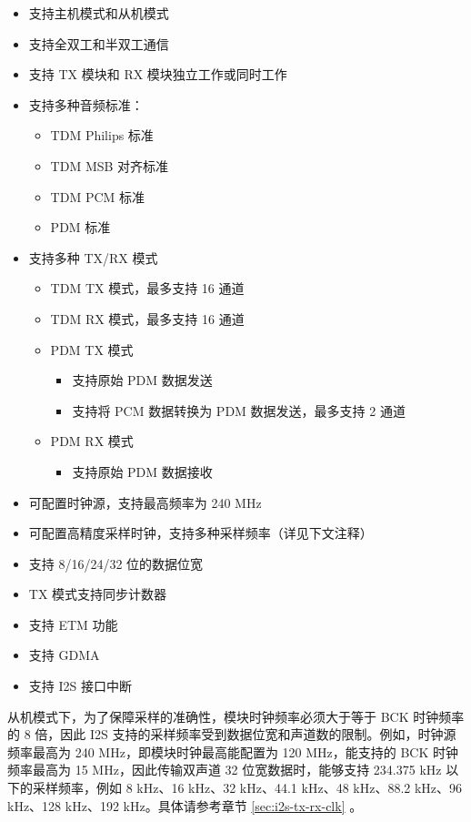 \documentclass[main\_\_CN.tex]{subfiles}
\begin{document}
\begin{itemize}
    \item 支持主机模式和从机模式
    \item 支持全双工和半双工通信
    \item 支持 TX 模块和 RX 模块独立工作或同时工作
    \item 支持多种音频标准：
        \begin{itemize}    
            \item TDM Philips 标准
            \item TDM MSB 对齐标准
            \item TDM PCM 标准
            \item PDM 标准
        \end{itemize}
    \item 支持多种 TX/RX 模式
        \begin{itemize}
        \item TDM TX 模式，最多支持 16 通道
        \item TDM RX 模式，最多支持 16 通道
        \item PDM TX 模式
        \begin{itemize}
            \item 支持原始 PDM 数据发送
            \item 支持将 PCM 数据转换为 PDM 数据发送，最多支持 2 通道
        \end{itemize}
        \item PDM RX 模式
        \begin{itemize}
            \item 支持原始 PDM 数据接收
        \end{itemize}
        \end{itemize}
    \item 可配置时钟源，支持最高频率为 240 MHz
    \item 可配置高精度采样时钟，支持多种采样频率（详见下文注释）
    \item 支持 8/16/24/32 位的数据位宽
    \item TX 模式支持同步计数器
    \item 支持 ETM 功能
    \item 支持 GDMA
    \item 支持 I2S 接口中断
\end{itemize}

\begin{tiplisting}
从机模式下，为了保障采样的准确性，模块时钟频率必须大于等于 BCK 时钟频率的 8 倍，因此 I2S 支持的采样频率受到数据位宽和声道数的限制。例如，时钟源频率最高为 240 MHz，即模块时钟最高能配置为 120 MHz，能支持的 BCK 时钟频率最高为 15 MHz，因此传输双声道 32 位宽数据时，能够支持 234.375 kHz 以下的采样频率，例如 8 kHz、16 kHz、32 kHz、44.1 kHz、48 kHz、88.2 kHz、96 kHz、128 kHz、192 kHz。具体请参考章节 \ref{sec:i2s-tx-rx-clk} \textit{}。
\end{tiplisting}
\end{document}
